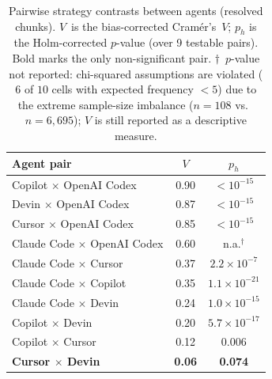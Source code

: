 \documentclass[sigconf,anonymous]{acmart}
\begin{document}
\begin{table}
  \caption{Pairwise strategy contrasts between agents (resolved chunks). $V$~is the bias-corrected Cram\'{e}r's~$V$; $p_h$ is the Holm-corrected $p$-value (over 9 testable pairs). Bold marks the only non-significant pair. $\dagger$~$p$-value not reported: chi-squared assumptions are violated ($6$ of $10$ cells with expected frequency ${<}5$) due to the extreme sample-size imbalance ($n{=}108$ vs.\ $n{=}6{,}695$); $V$ is still reported as a descriptive measure.}
  \label{tab:pairwise-agent}
  \small\setlength{\tabcolsep}{4pt}
  \begin{tabular}{lcc}
    \toprule
    Agent pair & $V$ & $p_h$ \\
    \midrule
    Copilot $\times$ OpenAI Codex   & 0.90 & ${<}10^{-15}$ \\
    Devin $\times$ OpenAI Codex     & 0.87 & ${<}10^{-15}$ \\
    Cursor $\times$ OpenAI Codex    & 0.85 & ${<}10^{-15}$ \\
    Claude Code $\times$ OpenAI Codex & 0.60 & n.a.$^\dagger$ \\
    Claude Code $\times$ Cursor     & 0.37 & $2.2\!\times\!10^{-7}$ \\
    Claude Code $\times$ Copilot    & 0.35 & $1.1\!\times\!10^{-21}$ \\
    Claude Code $\times$ Devin      & 0.24 & $1.0\!\times\!10^{-15}$ \\
    Copilot $\times$ Devin          & 0.20 & $5.7\!\times\!10^{-17}$ \\
    Copilot $\times$ Cursor         & 0.12 & $0.006$ \\
    \textbf{Cursor $\times$ Devin}  & \textbf{0.06} & \textbf{0.074}  \\
    \bottomrule
  \end{tabular}
\end{table}

\end{document}
